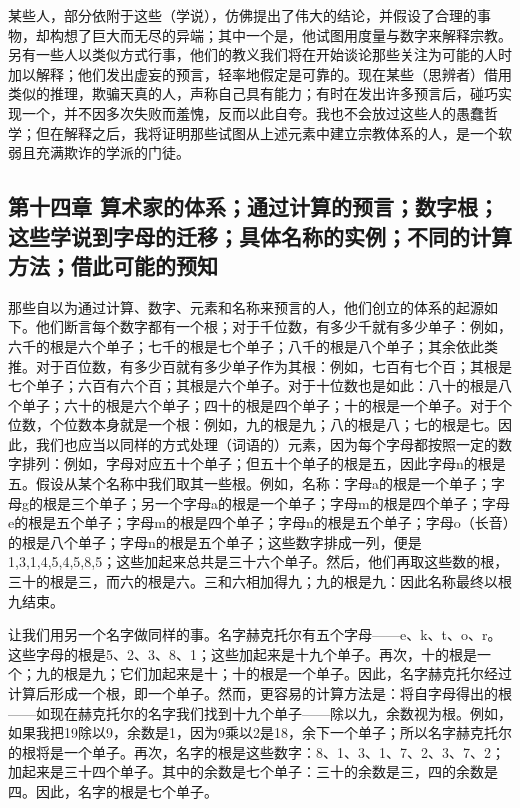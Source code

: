 某些人，部分依附于这些（学说），仿佛提出了伟大的结论，并假设了合理的事物，却构想了巨大而无尽的异端；其中一个是，他试图用度量与数字来解释宗教。另有一些人以类似方式行事，他们的教义我们将在开始谈论那些关注为可能的人时加以解释；他们发出虚妄的预言，轻率地假定是可靠的。现在某些（思辨者）借用类似的推理，欺骗天真的人，声称自己具有能力；有时在发出许多预言后，碰巧实现一个，并不因多次失败而羞愧，反而以此自夸。我也不会放过这些人的愚蠢哲学；但在解释之后，我将证明那些试图从上述元素中建立宗教体系的人，是一个软弱且充满欺诈的学派的门徒。\par


\subsection{第十四章 算术家的体系；通过计算的预言；数字根；这些学说到字母的迁移；具体名称的实例；不同的计算方法；借此可能的预知}

那些自以为通过计算、数字、元素和名称来预言的人，他们创立的体系的起源如下。他们断言每个数字都有一个根；对于千位数，有多少千就有多少单子：例如，六千的根是六个单子；七千的根是七个单子；八千的根是八个单子；其余依此类推。对于百位数，有多少百就有多少单子作为其根：例如，七百有七个百；其根是七个单子；六百有六个百；其根是六个单子。对于十位数也是如此：八十的根是八个单子；六十的根是六个单子；四十的根是四个单子；十的根是一个单子。对于个位数，个位数本身就是一个根：例如，九的根是九；八的根是八；七的根是七。因此，我们也应当以同样的方式处理（词语的）元素，因为每个字母都按照一定的数字排列：例如，字母对应五十个单子；但五十个单子的根是五，因此字母n的根是五。假设从某个名称中我们取其一些根。例如，名称：字母a的根是一个单子；字母g的根是三个单子；另一个字母a的根是一个单子；字母m的根是四个单子；字母e的根是五个单子；字母m的根是四个单子；字母n的根是五个单子；字母o（长音）的根是八个单子；字母n的根是五个单子；这些数字排成一列，便是1,3,1,4,5,4,5,8,5；这些加起来总共是三十六个单子。然后，他们再取这些数的根，三十的根是三，而六的根是六。三和六相加得九；九的根是九：因此名称最终以根九结束。\par

让我们用另一个名字做同样的事。名字赫克托尔有五个字母——e、k、t、o、r。这些字母的根是5、2、3、8、1；这些加起来是十九个单子。再次，十的根是一个；九的根是九；它们加起来是十；十的根是一个单子。因此，名字赫克托尔经过计算后形成一个根，即一个单子。然而，更容易的计算方法是：将自字母得出的根——如现在赫克托尔的名字我们找到十九个单子——除以九，余数视为根。例如，如果我把19除以9，余数是1，因为9乘以2是18，余下一个单子；所以名字赫克托尔的根将是一个单子。再次，名字的根是这些数字：8、1、3、1、7、2、3、7、2；加起来是三十四个单子。其中的余数是七个单子：三十的余数是三，四的余数是四。因此，名字的根是七个单子。\par

